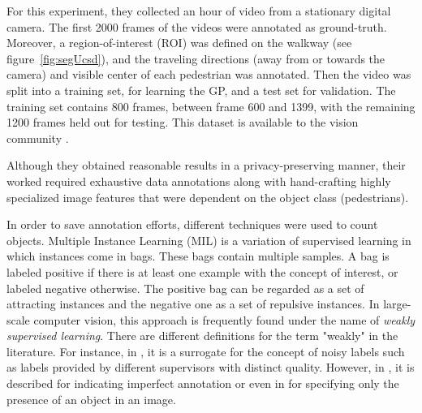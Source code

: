 For this experiment, they collected an hour of video from a stationary digital camera. The first 2000 frames of the videos were annotated as ground-truth. Moreover, a region-of-interest (ROI) was defined on the walkway (see figure~\ref{fig:segUcsd}), and the traveling directions (away from or towards the camera) and visible center of each pedestrian was annotated. Then the video was split into a training set, for learning the GP, and a test set for validation. The training set contains 800 frames, between frame 600 and 1399, with the remaining 1200 frames held out for testing. This dataset is available to the vision community \cite{chan2008privacy}.

Although they obtained reasonable results in a privacy-preserving manner, their worked required exhaustive data annotations along with hand-crafting highly specialized image features that were dependent on the object class (pedestrians).  



In order to save annotation efforts, different techniques were used to count objects. Multiple Instance Learning (MIL) \cite{foulds2010review} is a variation of supervised learning in which instances come in bags. These bags contain multiple samples. A bag is labeled positive if there is at least one example with the concept of interest, or labeled negative otherwise. The positive bag can be regarded as a set of attracting instances and the negative one as a set of repulsive instances. In large-scale computer vision, this approach is frequently found under the name of \textit{weakly supervised learning}. There are different definitions for the term "weakly" in the literature. For instance, in \cite{dekel2009good}, it is a surrogate for the concept of noisy labels such as labels provided by different supervisors with distinct quality. However, in \cite{raykar2009supervised}, it is described for indicating imperfect annotation or even in \cite{wang2013weakly} for specifying only the presence of an object in an image. 

